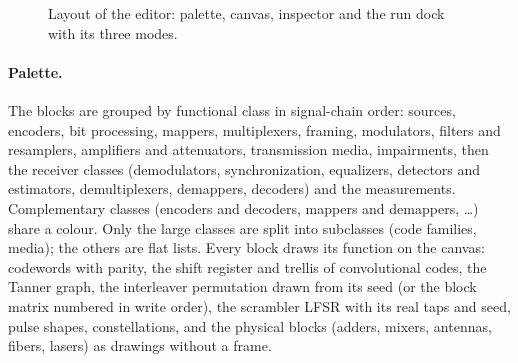 \begin{figure}[htbp]
\caption{Layout of the editor: palette, canvas, inspector and the run dock with its three
modes.}
\label{fig:gui-layout}
\end{figure}

\paragraph{Palette.}
The \numblocks{} blocks are grouped by functional class in signal-chain order: sources, encoders, bit
processing, mappers, multiplexers, framing, modulators, filters and resamplers, amplifiers and
attenuators, transmission media, impairments, then the receiver classes (demodulators,
synchronization, equalizers, detectors and estimators, demultiplexers, demappers, decoders) and
the measurements. Complementary classes (encoders and decoders, mappers and demappers, \dots)
share a colour. Only the large classes are split into subclasses (code families, media); the
others are flat lists. Every block draws its function on the canvas: codewords with parity, the
shift register and trellis of convolutional codes, the Tanner graph, the interleaver permutation
drawn from its seed (or the block matrix numbered in write order), the scrambler LFSR with its
real taps and seed, pulse shapes, constellations, and the physical blocks (adders, mixers,
antennas, fibers, lasers) as drawings without a frame.

